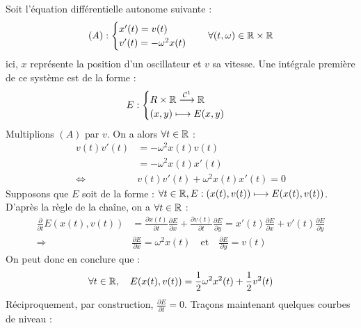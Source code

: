 \begin{example}
    Soit l'équation différentielle autonome suivante : 
        \[ (A) : 
            \begin{cases}
                x'(t) = v(t) \\
                v'(t) = - \omega ^2 x(t)
            \end{cases}
            \quad \forall (t,\omega) \in \mathbb{R} \times \mathbb{R} \] 
    ici, $x$ représente la position d'un oscillateur et $v$ sa vitesse. 
    Une intégrale première de ce système est de la forme : 
        \[ E : 
            \begin{cases}
                R \times \mathbb{R} \overset{ \mathcal{C}^1}{\longrightarrow} \mathbb{R} \\ 
                (x,y) \longmapsto E(x,y) 
            \end{cases} \] 
    Multiplions $(A)$ par $v$. On a alors $ \forall t \in \mathbb{R}$ : 
        \begin{align*}
            v(t) v'(t) &= - \omega ^2 x(t)v(t) \\ 
            &= - \omega ^2 x(t)x'(t) \\ 
            \iff & v(t) v'(t) + \omega ^2 x(t) x'(t) = 0 
        \end{align*}
    Supposons que $E$ soit de la forme : $ \forall t \in \mathbb{R}, E : (x(t), v(t)) \longmapsto E(x(t), v(t))$.
    D'après la règle de la chaîne, on a $ \forall t \in \mathbb{R}$ : 
        \begin{align*}
            \frac{\partial}{\partial t} E(x(t), v(t)) &= \frac{\partial x(t)}{\partial t} \frac{\partial E}{\partial x} + \frac{\partial v(t)}{\partial t} \frac{\partial E}{\partial y}
            = x'(t) \frac{\partial E}{\partial x} + v'(t) \frac{\partial E}{\partial y}  \\
            \Longrightarrow & \frac{\partial E}{\partial x} = \omega ^2 x(t) \quad \text{et} \quad \frac{\partial E}{\partial y} = v(t) 
        \end{align*}
        On peut donc en conclure que : 
            \[ \forall t \in \mathbb{R}, \quad E(x(t), v(t)) = \frac{1}{2} \omega^2 x^2(t) + \frac{1}{2} v^2(t) \]  
    Réciproquement, par construction, $ \frac{\partial E}{\partial t} = 0 $. 
    Traçons maintenant quelques courbes de niveau : 
    

\end{example}
